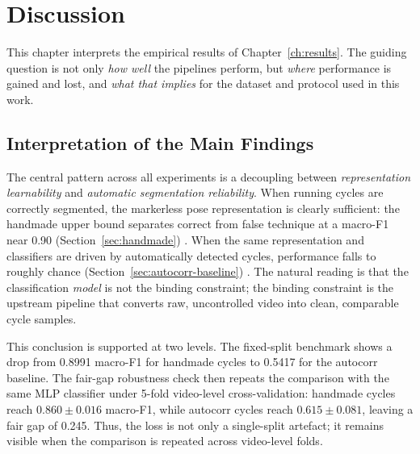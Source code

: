 %

\chapter{Discussion}
\label{ch:discussion}

This chapter interprets the empirical results of Chapter~\ref{ch:results}. The
guiding question is not only \emph{how well} the pipelines perform, but
\emph{where} performance is gained and lost, and \emph{what that implies} for
the dataset and protocol used in this work.

\section{Interpretation of the Main Findings}
\label{sec:disc-main}

The central pattern across all experiments is a decoupling between
\emph{representation learnability} and \emph{automatic segmentation
reliability}. When running cycles are correctly segmented, the markerless pose
representation is clearly sufficient: the handmade upper bound separates
correct from false technique at a macro-F1 near 0.90
(Section~\ref{sec:handmade}) . When the same representation and classifiers are
driven by automatically detected cycles, performance falls to roughly chance
(Section~\ref{sec:autocorr-baseline}) . The natural reading is that the
classification \emph{model} is not the binding constraint; the binding
constraint is the upstream pipeline that converts raw, uncontrolled video into
clean, comparable cycle samples.

This conclusion is supported at two levels. The fixed-split benchmark shows a
drop from 0.8991 macro-F1 for handmade cycles to 0.5417 for the autocorr
baseline. The fair-gap robustness check then repeats the comparison with the
same MLP classifier under 5-fold video-level cross-validation: handmade cycles
reach $0.860 \pm 0.016$ macro-F1, while autocorr cycles reach
$0.615 \pm 0.081$, leaving a fair gap of 0.245. Thus, the loss is not only a
single-split artefact; it remains visible when the comparison is repeated across
video-level folds.

